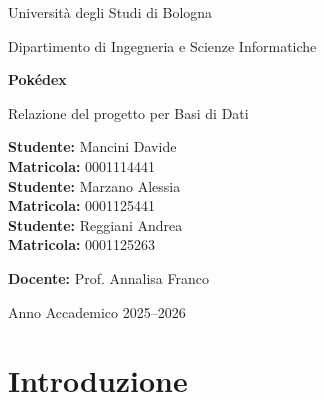 \documentclass[a4paper,12pt]{report}
\begin{document}
\begin{titlepage}
    \centering

    \vspace*{2cm}

    {\Large Università degli Studi di Bologna\par}

    \vspace{1cm}

    {\large Dipartimento di Ingegneria e Scienze Informatiche\par}

    \vfill

    {\fontsize{50pt}{50pt}\selectfont\bfseries Pokédex\par}

    \vspace{1cm}

    {\Large Relazione del progetto per Basi di Dati\par}

    \vfill

    \begin{flushleft}
        \textbf{Studente:} Mancini Davide\\
        \hspace*{2em}\textbf{Matricola:} 0001114441\\[0.5cm]
        \textbf{Studente:} Marzano Alessia\\
        \hspace*{2em}\textbf{Matricola:} 0001125441\\[0.5cm]
        \textbf{Studente:} Reggiani Andrea\\
        \hspace*{2em}\textbf{Matricola:} 0001125263
    \end{flushleft}

    \vspace{1cm}

    \begin{flushright}
        \textbf{Docente:} Prof. Annalisa Franco
    \end{flushright}

    \vfill

    {\large Anno Accademico 2025--2026\par}

\end{titlepage}

\tableofcontents

\chapter{Introduzione}
\end{document}

